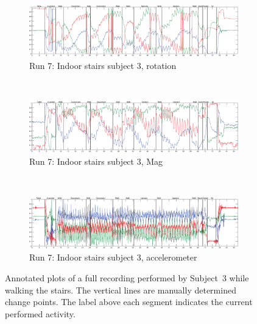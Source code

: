 \begin{figure}
  \centering
  \begin{subfigure}[b]{1\textwidth}
    \includegraphics[width=\textwidth]{./Figures/chapter6/data_collection/stairs-1-marc/data_plot_rot_annotated.eps}
    \caption{Run 7: Indoor stairs subject 3, rotation}
    \label{fig:data_gathering_run_7_rot}
  \end{subfigure} \\

  \begin{subfigure}[b]{1\textwidth}
    \includegraphics[width=\textwidth]{./Figures/chapter6/data_collection/stairs-1-marc/data_plot_mag_annotated.eps}
    \caption{Run 7: Indoor stairs subject 3, Mag}
    \label{fig:data_gathering_run_7_mag}
  \end{subfigure} \\

  \begin{subfigure}[b]{1\textwidth}
    \includegraphics[width=\textwidth]{./Figures/chapter6/data_collection/stairs-1-marc/data_plot_acc_annotated.eps}
    \caption{Run 7: Indoor stairs subject 3, accelerometer}
    \label{fig:data_gathering_run_7_acc}
  \end{subfigure}
  \caption[Plots subject 3]{Annotated plots of a full recording performed by Subject~$3$ while walking the stairs. The vertical lines are manually determined change points. The label above each segment indicates the current performed activity.}\label{fig:plots_subject_3}
\end{figure}